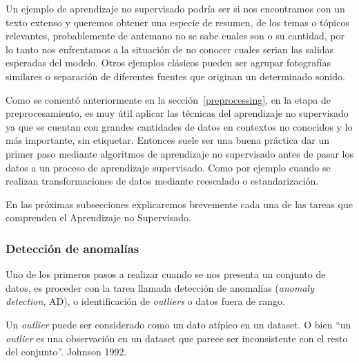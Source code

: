 \documentclass[a4paper,12pt]{article}
\begin{document}
Un ejemplo de aprendizaje no supervisado podría ser si nos encontramos con un texto extenso y queremos obtener una especie de resumen, de los temas o tópicos relevantes, probablemente de antemano no se sabe cuales son o su cantidad, por lo tanto nos enfrentamos a la situación de no conocer cuales serian las salidas esperadas del modelo. 
Otros ejemplos clásicos pueden ser agrupar fotografías similares o separación de diferentes fuentes que originan un determinado sonido. 

Como se comentó anteriormente en la sección~\ref{preprocessing}, en la etapa de preprocesamiento, es muy útil aplicar las técnicas del aprendizaje no supervisado ya que se cuentan con grandes cantidades de datos en contextos no conocidos y lo más importante, sin etiquetar. Entonces suele ser una buena práctica dar un primer paso mediante algoritmos de aprendizaje no supervisado antes de pasar los datos a un proceso de aprendizaje supervisado. Como por ejemplo cuando se realizan transformaciones de datos mediante reescalado o estandarización. 

En las próximas subsecciones explicaremos brevemente cada una de las tareas que comprenden el Aprendizaje no Supervisado.

\subsubsection{Detección de anomalías}

Uno de los primeros pasos a realizar cuando se nos presenta un conjunto de datos, es proceder con la tarea llamada detección de anomalías (\textit{anomaly detection}, AD), o identificación de \textit{outliers} o datos fuera de rango. 

Un \textit{outlier} puede ser considerado como un dato atípico en un dataset. O bien “un \textit{outlier} es una observación en un dataset que parece ser inconsistente con el resto del conjunto”. Johnson 1992.
\end{document}
